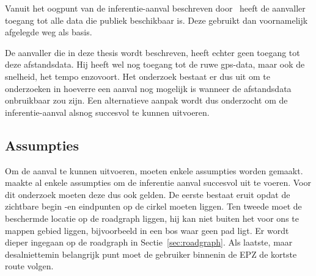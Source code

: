 Vanuit het oogpunt van de inferentie-aanval beschreven
door~\citeauthor{Dhondt_Pochat_Voulimeneas_Joosen_Volckaert_2022} heeft de
aanvaller toegang tot alle data die publiek beschikbaar is. Deze gebruikt dan
voornamelijk afgelegde weg als basis.

De aanvaller die in deze thesis wordt beschreven, heeft echter geen toegang tot
deze afstandsdata. Hij heeft wel nog toegang tot de ruwe gps-data, maar ook de
snelheid, het tempo enzovoort. Het onderzoek bestaat er dus uit om te
onderzoeken in hoeverre een aanval nog mogelijk is wanneer de afstandsdata
onbruikbaar zou zijn. Een alternatieve aanpak wordt dus onderzocht om de
inferentie-aanval alsnog succesvol te kunnen uitvoeren.

\subsection{Assumpties}
Om de aanval te kunnen uitvoeren, moeten enkele assumpties worden gemaakt.
\citeauthor{Dhondt_Pochat_Voulimeneas_Joosen_Volckaert_2022} maakte al enkele
assumpties om de inferentie aanval succesvol uit te voeren. Voor dit onderzoek
moeten deze dus ook gelden. De eerste bestaat eruit opdat de zichtbare begin
-en eindpunten op de cirkel moeten liggen. Ten tweede moet de beschermde
locatie op de roadgraph liggen, hij kan niet buiten het voor ons te mappen
gebied liggen, bijvoorbeeld in een bos waar geen pad ligt. Er wordt dieper
ingegaan op de roadgraph in Sectie~\ref{sec:roadgraph}. Als laatste, maar
desalniettemin belangrijk punt moet de gebruiker binnenin de \ac{EPZ} de
kortste route volgen.~\cite{Dhondt_Pochat_Voulimeneas_Joosen_Volckaert_2022}

